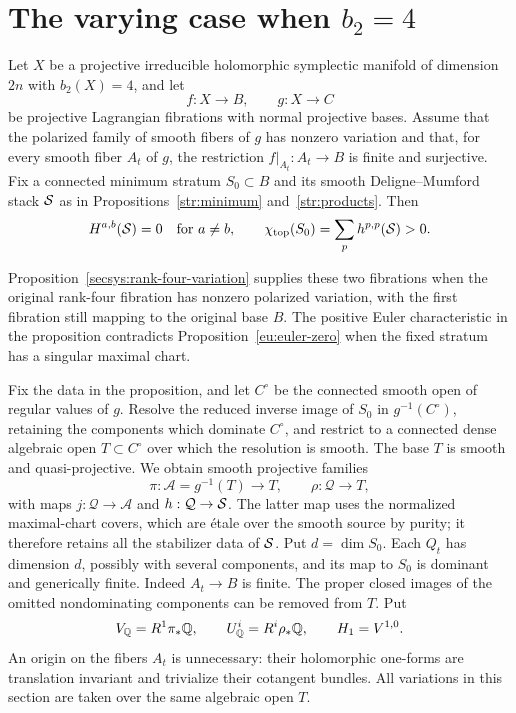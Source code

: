 \section{The varying case when \texorpdfstring{$b_2=4$}{b2=4}}
\label{var:section}
\label{sec:variation}

\begin{proposition}\label{var:exclusion}
Let $X$ be a projective irreducible holomorphic symplectic manifold of
dimension $2n$ with $b_2(X)=4$, and let
\[
                         f:X\longrightarrow B,\qquad
                         g:X\longrightarrow C
\]
be projective Lagrangian fibrations with normal projective bases.
Assume that the polarized family of smooth fibers of $g$ has nonzero
variation and that, for every smooth fiber $A_t$ of $g$, the restriction
$f|_{A_t}:A_t\to B$ is finite and surjective.
Fix a connected minimum stratum $S_0\subset B$ and its smooth
Deligne--Mumford stack $\mathcal S$ as in Propositions~\ref{str:minimum}
and~\ref{str:products}.  Then
\[
 H^{a,b}(\mathcal S)=0\quad\text{for }a\ne b,\qquad
 \chi_{\mathrm{top}}(S_0)=\sum_p h^{p,p}(\mathcal S)>0.
\]
\end{proposition}

Proposition~\ref{secsys:rank-four-variation} supplies these two
fibrations when the original rank-four fibration has nonzero polarized
variation, with the first fibration still mapping to the original
base $B$.  The positive Euler characteristic in the proposition
contradicts Proposition~\ref{eu:euler-zero} when the fixed stratum has
a singular maximal chart.

Fix the data in the proposition, and let $C^\circ$ be the connected
smooth open of regular values of $g$.
Resolve the reduced inverse image of $S_0$ in $g^{-1}(C^\circ)$,
retaining the components which dominate $C^\circ$, and restrict to a
connected dense algebraic open $T\subset C^\circ$ over which the
resolution is smooth.  The base $T$ is smooth and quasi-projective.
We obtain smooth projective families
\[
 \pi:\mathcal A=g^{-1}(T)\longrightarrow T,
 \qquad \rho:\mathcal Q\longrightarrow T,
\]
with maps $j:\mathcal Q\to\mathcal A$ and $h:\mathcal Q\to\mathcal S$.
The latter map uses the normalized maximal-chart covers, which are
\'etale over the smooth source by purity; it therefore retains all the
stabilizer data of $\mathcal S$.  Put $d=\dim S_0$.  Each $Q_t$ has dimension
$d$, possibly with several components, and its map to $S_0$ is dominant and generically
finite.  Indeed $A_t\to B$ is finite.  The proper closed images of the
omitted nondominating components can be removed from $T$.
Put
\[
 V_\mathbb Q=R^1\pi_*\mathbb Q,
 \qquad U^i_\mathbb Q=R^i\rho_*\mathbb Q,
 \qquad H_1=V^{1,0}.
\]
An origin on the fibers $A_t$ is unnecessary: their holomorphic
one-forms are translation invariant and trivialize their cotangent
bundles.  All variations in this section are taken over the same
algebraic open $T$.


